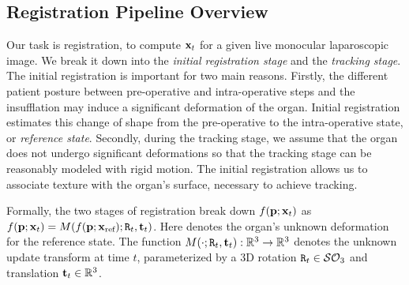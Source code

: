 \subsection{Registration Pipeline Overview}
\label{sec:globalOverview}
Our task is registration, to compute $\mathbf{x}_t$ for a given live monocular laparoscopic image. 
We break it down into the \textit{initial registration stage} and the \emph{tracking stage}. 
The initial registration is important for two main reasons. Firstly, the different patient posture between pre-operative and intra-operative steps and the insufflation may induce a significant deformation of the organ. Initial registration estimates this change of shape from the pre-operative to the intra-operative state, or \emph{reference state}. 
Secondly, during the tracking stage, we assume that the organ does not undergo significant deformations so that the tracking stage can be reasonably modeled with rigid motion.  The initial registration allows us to associate texture with the organ's surface, necessary to achieve tracking.

Formally, the two stages of registration break down $f(\mathbf{p};\mathbf{x}_t)$ as $f(\vet{p};\vet{x}_{t})=M(f(\vet{p};\xref);\mat{R}_{t},\vet{t}_{t})$. Here \xref denotes the organ's unknown deformation for the reference state.
The function $M(\cdot;\mat{R}_{t},\vet{t}_{t}):\mathbb{R}^3\rightarrow \mathbb{R}^3$ denotes the unknown update transform at time $t$, parameterized by a 3D rotation $\mat{R}_{t}\in \mathcal{SO}_{3}$ and translation $\mathbf{t}_{t}\in \mathbb{R}^3$.

